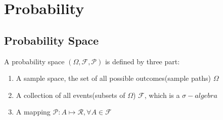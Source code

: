 \documentclass[a4paper, 12pt]{article}
\begin{document}
\section{Probability}
\subsection{Probability Space}
A probability space $(\Omega, \mathcal{F}, \mathcal{P})$ is defined by three part:
\begin{enumerate}
	\item A sample space, the set of all possible outcomes(sample paths) $\Omega$
	\item A collection of all events(subsets of $\Omega$) $\mathcal{F}$, which is a $\sigma-algebra$
	\item A mapping $\mathcal{P}: A \mapsto \mathcal{R}, \forall A \in \mathcal{F}$ 
\end{enumerate}
\end{document}
